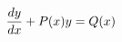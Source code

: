 \documentclass[preview]{standalone}
\begin{document}
\begin{align*}
\special{dvisvgm:raw <g id='unique000'>}\frac{dy}{dx} + P(x)y = Q(x)\special{dvisvgm:raw </g>}
\end{align*}
\end{document}
